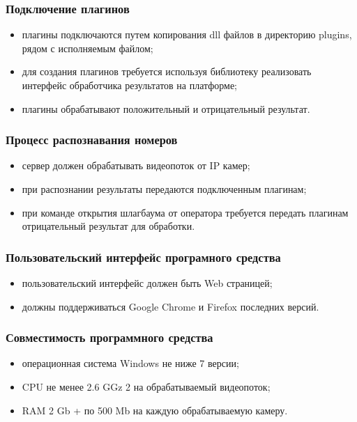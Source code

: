 \subsubsection{Подключение плагинов}
\begin{itemize}
	\item плагины подключаются путем копирования dll файлов в директорию plugins, рядом с исполняемым файлом;
	\item для создания плагинов требуется используя библиотеку реализовать интерфейс обработчика результатов на платформе;
	\item плагины обрабатывают положительный и отрицательный результат.
\end{itemize}

\subsubsection{Процесс распознавания номеров}
\begin{itemize}
	\item сервер должен обрабатывать видеопоток от IP камер;
	\item при распознании результаты передаются подключенным плагинам;
	\item при команде открытия шлагбаума от оператора требуется передать плагинам отрицательный результат для обработки.
\end{itemize}

\subsubsection{Пользовательский интерфейс програмного средства}
\begin{itemize}
	\item пользовательский интерфейс должен быть Web страницей;
	\item должны поддерживаться Google Chrome и Firefox последних версий.
\end{itemize}

\subsubsection{Совместимость программного средства}
\begin{itemize}
  \item операционная система Windows не ниже 7 версии;
	\item CPU не менее 2.6 GGz 2 на обрабатываемый видеопоток;
  \item RAM 2 Gb + по 500 Mb на каждую обрабатываемую камеру.
\end{itemize}